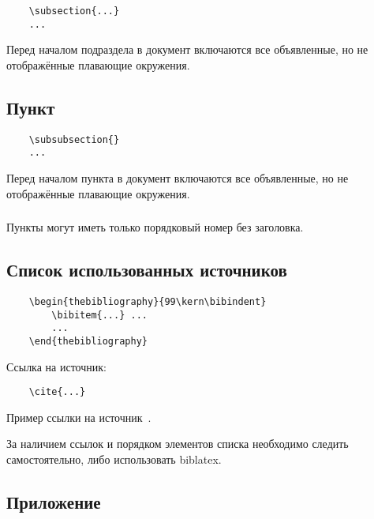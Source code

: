 \documentclass[14pt, a4paper, titlepage]{extarticle}
\begin{document}
\begin{verbatim}
	\subsection{...}
	...
\end{verbatim}

Перед началом подраздела в документ включаются все объявленные, но не отображённые плавающие окружения.

\subsection{Пункт}

\begin{verbatim}
	\subsubsection{}
	...
\end{verbatim}

Перед началом пункта в документ включаются все объявленные, но не отображённые плавающие окружения.

\subsubsection{}

Пункты могут иметь только порядковый номер без заголовка.


\subsection{Список использованных источников}

\begin{verbatim}
	\begin{thebibliography}{99\kern\bibindent}
		\bibitem{...} ...
		...
	\end{thebibliography}
\end{verbatim}

Ссылка на источник:
\begin{verbatim}
	\cite{...}
\end{verbatim}

Пример ссылки на источник~\cite{bib:recomendations}.

За наличием ссылок и порядком элементов списка необходимо следить самостоятельно, либо использовать biblatex.


\subsection{Приложение}
\end{document}
